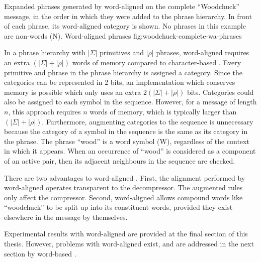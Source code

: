 

{Expanded phrases generated by word-aligned \repair on the
complete ``Woodchuck'' message, in the order in which
they were added to the phrase hierarchy.  In front of 
each phrase, its word-aligned category is shown.
No phrases in this example are non-words (N).}
{Word-aligned \repair phrases}
{fig:woodchuck-complete-wa-phrases}

In a phrase hierarchy with $|\Sigma|$ primitives and $|\rho|$
phrases, word-aligned \repair requires an extra
$(|\Sigma| + |\rho|)$ words of memory compared to 
character-based \repair.  Every primitive and phrase in the 
phrase hierarchy is assigned a category.  Since the categories 
can be represented in 2 bits, an implementation which conserves
memory is possible which only uses an extra $2(|\Sigma| + |\rho|)$ 
bits.  
Categories could also be assigned to each symbol in
the sequence.  However, for a message of length $n$,
this approach requires $n$ words of
memory, which is typically larger than $(|\Sigma| + |\rho|)$.
Furthermore, augmenting categories to the sequence is
unnecessary because the category of a symbol in
the sequence is the same as its category in the phrase.
The phrase ``wood'' is a word symbol (W), regardless of the context
in which it appears.  When an occurrence of ``wood'' 
is considered as a component of an active pair, then its
adjacent neighbours in the sequence are checked.

There are two advantages to word-aligned \repair.  First, the 
alignment performed by word-aligned \repair operates
transparent to the decompressor.  
The augmented rules only affect the compressor.
Second, word-aligned \repair allows compound words 
like ``woodchuck'' to be split up into its constituent
words, provided they exist elsewhere in the message by 
themselves.

Experimental results with word-aligned \repair are provided
at the final section of this thesis.  However, problems with 
word-aligned \repair exist, and are addressed in the next section
by word-based \repair.


